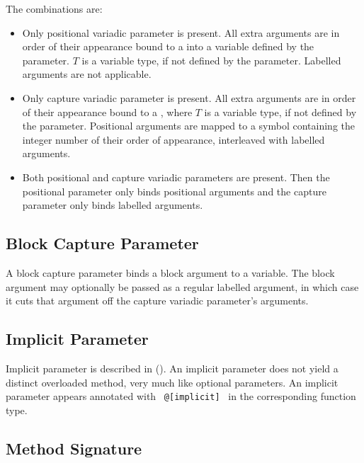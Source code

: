 The combinations are:
\begin{itemize}
  \item Only positional variadic parameter is present. All extra arguments are in order of their appearance bound to a  into a variable defined by the parameter. $T$ is a variable type, if not defined by the parameter. Labelled arguments are not applicable. 
  \item Only capture variadic parameter is present. All extra arguments are in order of their appearance bound to a , where $T$ is a variable type, if not defined by the parameter. Positional arguments are mapped to a symbol containing the integer number of their order of appearance, interleaved with labelled arguments. 
  \item Both positional and capture variadic parameters are present. Then the positional parameter only binds positional arguments and the capture parameter only binds labelled arguments. 
\end{itemize}





\subsection{Block Capture Parameter}
\label{sec:block-capture-parameter}

A block capture parameter binds a block argument to a variable. The block argument may optionally be passed as a regular labelled argument, in which case it cuts that argument off the capture variadic parameter's arguments. 





\subsection{Implicit Parameter}
\label{sec:implicit-parameter}

Implicit parameter is described in (). An implicit parameter does not yield a distinct overloaded method, very much like optional parameters. An implicit parameter appears annotated with ~\lstinline[deletekeywords={implicit}]!@[implicit]!~ in the corresponding function type. 





\subsection{Method Signature}
\label{sec:method-signature}

